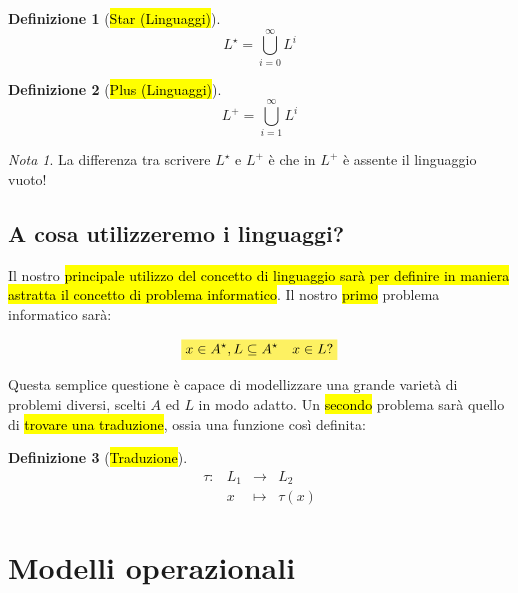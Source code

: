 \documentclass[a4paper,11pt,oneside]{article}
\theoremstyle{plain}
\theoremstyle{definition}
\newtheorem{defn}{Definizione}[section]
\theoremstyle{remark}
\newtheorem*{nota}{Nota}
\newcommand{\mhl}[1]{\colorbox{hlcolor}{$\displaystyle #1$}}
\begin{document}
\begin{defn}[\hl{Star (Linguaggi)}]\label{def:star-linguaggi}
  \begin{equation}
    L^\star = \bigcup^{\infty}_{i=0} L^i
  \end{equation}
\end{defn}

\begin{defn}[\hl{Plus (Linguaggi)}]\label{def:plus-linguaggi}
  \begin{equation}
    L^+ = \bigcup^{\infty}_{i=1} L^i
  \end{equation}
\end{defn}

\begin{nota}
  La differenza tra scrivere $L^\star$ e $L^+$ è che in $L^+$ è assente il
  linguaggio vuoto!
\end{nota}

\subsection{A cosa utilizzeremo i linguaggi?}

Il nostro \hl{principale utilizzo del concetto di linguaggio sarà per definire
in maniera astratta il concetto di problema informatico}. Il nostro \hl{primo}
problema informatico sarà:

\begin{equation}
  \mhl{ x \in A^\star, L \subseteq A^\star \quad  x \in L? }
\end{equation}

Questa semplice questione è capace di modellizzare una grande varietà di
problemi diversi, scelti $A$ ed $L$ in modo adatto. Un \hl{secondo} problema sarà
quello di \hl{trovare una traduzione}, ossia una funzione così definita:

\begin{defn}[\hl{Traduzione}]\label{def:traduzione}
  \begin{equation}
    \begin{array}{cccc}
      \tau: & L_1 & \to     & L_2 \\
            & x   & \mapsto & \tau(x)
    \end{array}
  \end{equation}
\end{defn}

\section{Modelli operazionali}\label{sec:modelli-operazionali}
\end{document}

